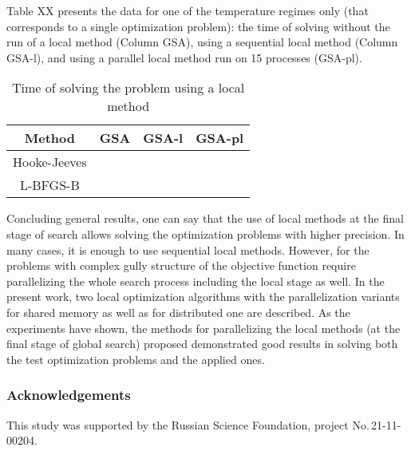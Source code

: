 \documentclass[runningheads]{llncs}
\begin{document}
Table XX presents the data for one of the temperature regimes only (that corresponds to a single optimization problem): the time of solving without the run of a local method (Column GSA), using a sequential local method (Column GSA-l), and using a parallel local method run on 15 processes (GSA-pl).

\begin{table}[ht]
	\caption{Time of solving the problem using a local method}
	\label{tab:12}
	\center
		\begin{tabular}{|c|c|c|c|}
		\hline
		Method & GSA & GSA-l & GSA-pl \\
		\hline 
		Hooke-Jeeves &  &  &   \\
		\hline
		L-BFGS-B &  &  &   \\
		\hline
	\end{tabular}
\end{table}

Concluding general results, one can say that the use of local methods at the final stage of search allows solving the optimization problems with higher precision. In many cases, it is enough to use sequential local methods. However, for the problems with complex gully structure of the objective function require parallelizing the whole search process including the local stage as well. In the present work, two local optimization algorithms with the parallelization variants for shared memory as well as for distributed one are described. As the experiments have shown, the methods for parallelizing the local methods (at the final stage of global search) proposed demonstrated good results in solving both the test optimization problems and the applied ones. 

\subsubsection{Acknowledgements} This study was supported by the Russian Science Foundation, project No.\,21-11-00204.

%
%
%


%
\end{document}
